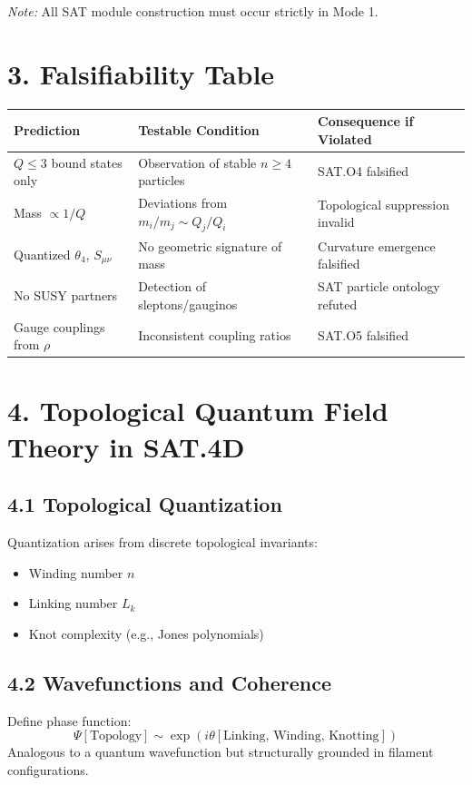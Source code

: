 \documentclass[12pt]{article}
\begin{document}
\textit{Note:} All SAT module construction must occur strictly in Mode 1.

\section*{3. Falsifiability Table}

\begin{center}
\begin{tabular}{@{}lll@{}}
\toprule
\textbf{Prediction} & \textbf{Testable Condition} & \textbf{Consequence if Violated} \\
\midrule
$Q \leq 3$ bound states only & Observation of stable $n \geq 4$ particles & SAT.O4 falsified \\
Mass $\propto 1/Q$ & Deviations from $m_i/m_j \sim Q_j/Q_i$ & Topological suppression invalid \\
Quantized $\theta_4$, $S_{\mu\nu}$ & No geometric signature of mass & Curvature emergence falsified \\
No SUSY partners & Detection of sleptons/gauginos & SAT particle ontology refuted \\
Gauge couplings from $\rho$ & Inconsistent coupling ratios & SAT.O5 falsified \\
\bottomrule
\end{tabular}
\end{center}

\section*{4. Topological Quantum Field Theory in SAT.4D}

\subsection*{4.1 Topological Quantization}
Quantization arises from discrete topological invariants:
\begin{itemize}
  \item Winding number $n$
  \item Linking number $L_k$
  \item Knot complexity (e.g., Jones polynomials)
\end{itemize}

\subsection*{4.2 Wavefunctions and Coherence}
Define phase function:
\[
\Psi[\text{Topology}] \sim \exp(i\theta[\text{Linking, Winding, Knotting}])
\]
Analogous to a quantum wavefunction but structurally grounded in filament configurations.
\end{document}

